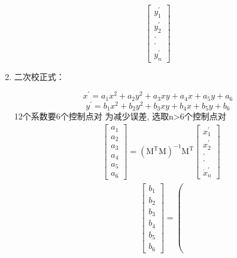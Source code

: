\documentclass{ctexart}
\begin{document}
\begin{enumerate}
$$              \left[\begin{array}{c}y_{1}^{\prime} \\ y_{2}^{\prime} \\ \cdot \\ \cdot \\ y_{n}^{\prime}\end{array}\right]$$
    \item 二次校正式：

          $$x^{\prime}=a_{1} x^{2}+a_{2} y^{2}+a_{3} x y+a_{4} x+a_{5} y+a_{6}$$
          $$y^{\prime}=b_{1} x^{2}+b_{2} y^{2}+b_{3} x y+b_{4} x+b_{5} y+b_{6}$$
          12个系数要6个控制点对 为减少误差, 选取n>6个控制点对
          $$
              \begin{aligned}
                  &{\left[\begin{array}{l}
                          a_{1} \\
                          a_{2} \\
                          a_{3} \\
                          a_{4} \\
                          a_{5} \\
                          a_{6}
                      \end{array}\right]=\left(\mathrm{M}^{\mathrm{T}} \mathrm{M}\right)^{-1} \mathrm{M}^{\mathrm{T}}\left[\begin{array}{c}
                          x_{1}^{\prime} \\
                          x_{2}^{\prime} \\
                          \cdot          \\
                          \cdot          \\
                          \dot{x}_{n}^{\prime}
                      \end{array}\right]} \end{aligned}
          $$
          $$
              \begin{aligned}
                   & {\left[\begin{array}{c}
                          b_{1} \\
                          b_{2} \\
                          b_{3} \\
                          b_{4} \\
                          b_{5} \\
                          b_{6}
                      \end{array}\right]=\left(
}
\end{aligned}$$
\end{enumerate}
\end{document}
